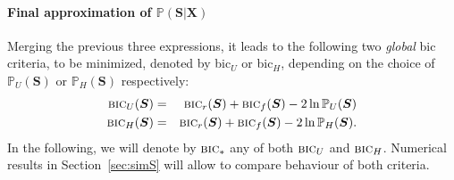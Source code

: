 \documentclass[11pt,a4paper]{article}
\begin{document}
\paragraph{Final approximation of $\mathbb{P}(\boldsymbol{S}|\boldsymbol{X})$}
Merging the previous three expressions, it leads to the following two {\it global} {\sc bic} criteria, to be minimized, denoted by {\sc bic}$_U$ or {\sc bic}$_H$, depending on the choice of $\mathbb{P}_U(\boldsymbol{S})$ or $\mathbb{P}_H(\boldsymbol{S})$ respectively:
\begin{eqnarray}
\mbox{{\sc bic}}_U(\boldsymbol{S}) & = & \mbox{{\sc bic}}_r(\boldsymbol{S}) + \mbox{{\sc bic}}_f(\boldsymbol{S}) - 2\ln \mathbb{P}_U(\boldsymbol{S}) \\
\mbox{{\sc bic}}_H(\boldsymbol{S}) & = & \mbox{{\sc bic}}_r(\boldsymbol{S}) + \mbox{{\sc bic}}_f(\boldsymbol{S}) - 2\ln \mathbb{P}_H(\boldsymbol{S}).
\end{eqnarray}
In the following, we will denote by $\mbox{{\sc bic}}_*$ any of both $\mbox{{\sc bic}}_U$ and $\mbox{{\sc bic}}_H$. Numerical results in Section~\ref{sec:simS} will allow to compare behaviour of both criteria.
\end{document}
